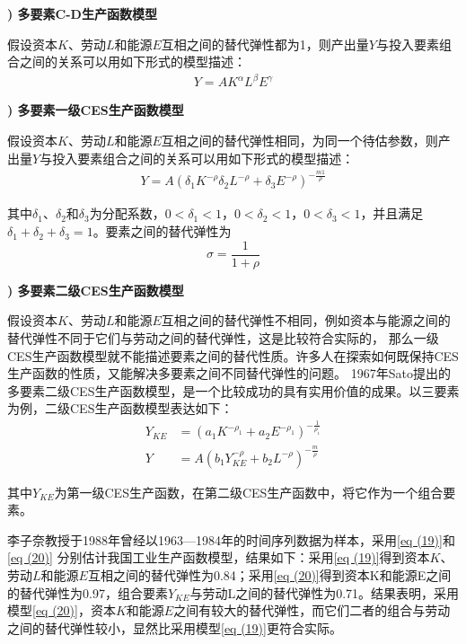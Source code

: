 {\bf {}) 多要素C-D生产函数模型}
		
	假设资本$ K $、劳动$ L $和能源$ E $互相之间的替代弹性都为1，则产出量$ Y $与投入要素组合之间的关系可以用如下形式的模型描述：
	\begin{align}
		Y=A K^{\alpha} L^{\beta} E^{\gamma} \label{eq (18)}
	\end{align}

{\bf {}) 多要素一级CES生产函数模型}
		
	假设资本$ K $、劳动$ L $和能源$ E $互相之间的替代弹性相同，为同一个待估参数，则产出量$ Y $与投入要素组合之间的关系可以用如下形式的模型描述：
	\begin{align}
		Y = A\left(\delta_{1} K^{-\rho} \delta_{2} L^{-\rho}+\delta_{3} E^{-\rho}\right)^{-\frac{m 1}{\rho}}
			\label{eq (19)}
	\end{align}
		
	其中$ \delta_{1} $、$ \delta_{2} $和$ \delta_{3} $为分配系数，$ 0<\delta_{1}<1 $，$ 0<\delta_{2}<1 $，$ 0<\delta_{3}<1 $，并且满足$ \delta_{1}+\delta_{2}+\delta_{3}=1 $。要素之间的替代弹性为
	$$ \sigma =\frac{1}{1+\rho } $$
		
{\bf {}) 多要素二级CES生产函数模型}
		
	假设资本$ K $、劳动$ L $和能源$ E $互相之间的替代弹性不相同，例如资本与能源之间的替代弹性不同于它们与劳动之间的替代弹性，这是比较符合实际的，
	那么一级CES生产函数模型就不能描述要素之间的替代性质。许多人在探索如何既保持CES生产函数的性质，又能解决多要素之间不同替代弹性的问题。
	1967年Sato提出的多要素二级CES生产函数模型，是一个比较成功的具有实用价值的成果。以三要素为例，二级CES生产函数模型表达如下：
	\begin{align}
		Y_{K E} & = \left(a_{1} K^{-\rho_{1}}+a_{2} E^{-\rho_{1}}\right)^{-\frac{1}{\rho_{1}}} \nonumber \\
		Y & = A\left(b_{1} Y_{K E}^{-\rho}+b_{2} L^{-\rho}\right)^{-\frac{m}{\rho}}
		\label{eq (20)}
	\end{align}

	其中$ Y_{KE} $为第一级CES生产函数，在第二级CES生产函数中，将它作为一个组合要素。
	
	李子奈教授于1988年曾经以1963—1984年的时间序列数据为样本，采用\eqref{eq (19)}和\eqref{eq (20)}
	分别估计我国工业生产函数模型，结果如下：采用\eqref{eq (19)}得到资本$ K $、劳动$ L $和能源$ E $互相之间的替代弹性为0.84；采用\eqref{eq (20)}得到资本K和能源E之间的替代弹性为0.97，组合要素$ Y_{KE} $与劳动L之间的替代弹性为0.71。结果表明，采用模型\eqref{eq (20)}，资本$ K $和能源$ E $之间有较大的替代弹性，而它们二者的组合与劳动之间的替代弹性较小，显然比采用模型\eqref{eq (19)}更符合实际。
		
